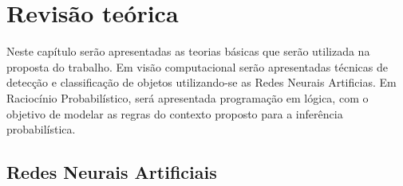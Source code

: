 \documentclass[
	12pt,				%
    oneside,			%
	a4paper,			%
	english,			%
	french,				%
	spanish,			%
	brazil,				%
	]{abntex2}
\begin{document}
\chapter{Revisão teórica}

Neste capítulo serão apresentadas as teorias básicas que serão utilizada na proposta do trabalho. Em visão computacional serão apresentadas técnicas de detecção e classificação de objetos utilizando-se as Redes Neurais Artificias. Em Raciocínio Probabilístico, será apresentada programação em lógica, com o objetivo de modelar as regras do contexto proposto para a inferência probabilística.

\section {Redes Neurais Artificiais}




\end{document}
